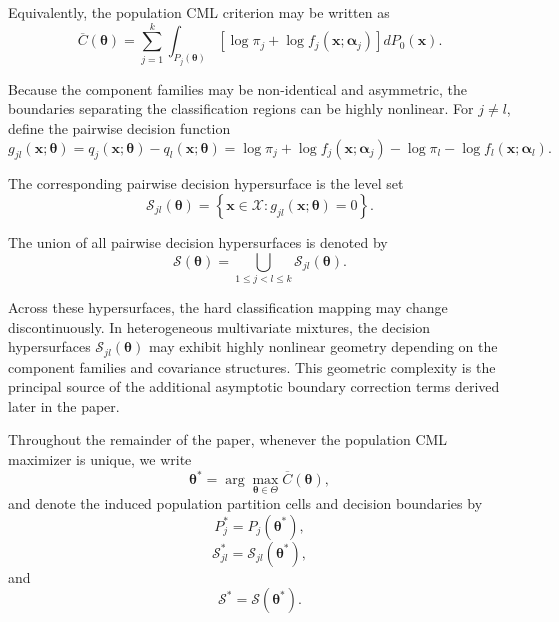 \documentclass[pdflatex,sn-mathphys-ay]{sn-jnl}%
\let\oldtheta\theta
\renewcommand{\theta}{\boldsymbol{\oldtheta}}
\let\oldalpha\alpha
\renewcommand{\alpha}{\boldsymbol{\oldalpha}}
\theoremstyle{thmstyleone}%
\theoremstyle{thmstyletwo}%
\theoremstyle{thmstylethree}%
\begin{document}
Equivalently, the population CML criterion may be written as
\begin{equation}
    \overline{C}(\boldsymbol{\theta})
    =
    \sum_{j=1}^k
    \int_{P_j(\boldsymbol{\theta})}
    \left[
        \log \pi_j
        +
        \log f_j(\mathbf{x};\boldsymbol{\alpha}_j)
    \right]
    dP_0(\mathbf{x}).
    \label{eq:pop_cml_partition}
\end{equation}

Because the component families may be non-identical and asymmetric, the boundaries separating the classification regions can be highly nonlinear. For $j\neq l$, define the pairwise decision function
\begin{equation}
    g_{jl}(\mathbf{x};\boldsymbol{\theta})
    =
    q_j(\mathbf{x};\boldsymbol{\theta})
    -
    q_l(\mathbf{x};\boldsymbol{\theta})
    =
    \log \pi_j
    +
    \log f_j(\mathbf{x};\boldsymbol{\alpha}_j)
    -
    \log \pi_l
    -
    \log f_l(\mathbf{x};\boldsymbol{\alpha}_l).
    \label{eq:decision_function}
\end{equation}

The corresponding pairwise decision hypersurface is the level set
\begin{equation}
    \mathcal{S}_{jl}(\boldsymbol{\theta})
    =
    \left\{
    \mathbf{x}\in\mathcal{X}:
    g_{jl}(\mathbf{x};\boldsymbol{\theta})=0
    \right\}.
    \label{eq:decision_surface}
\end{equation}

The union of all pairwise decision hypersurfaces is denoted by
\begin{equation}
    \mathcal{S}(\boldsymbol{\theta})
    =
    \bigcup_{1\leq j<l\leq k}
    \mathcal{S}_{jl}(\boldsymbol{\theta}).
    \label{eq:decision_boundary_union}
\end{equation}

Across these hypersurfaces, the hard classification mapping may change discontinuously. In heterogeneous multivariate mixtures, the decision hypersurfaces $ \mathcal{S}_{jl}(\boldsymbol{\theta})$ may exhibit highly nonlinear geometry depending on the component families and covariance structures. This geometric complexity is the principal source of the additional asymptotic boundary correction terms derived later in the paper.

Throughout the remainder of the paper, whenever the population CML maximizer is unique, we write
\[
    \boldsymbol{\theta}^*
    =
    \arg\max_{\boldsymbol{\theta}\in\Theta}
    \overline{C}(\boldsymbol{\theta}),
\]
and denote the induced population partition cells and decision boundaries by
\[
    P_j^*
    =
    P_j(\boldsymbol{\theta}^*),
\]
\[
    \mathcal{S}_{jl}^*
    =
    \mathcal{S}_{jl}(\boldsymbol{\theta}^*),
\]
and
\[
    \mathcal{S}^*
    =
    \mathcal{S}(\boldsymbol{\theta}^*).
\]
\end{document}
